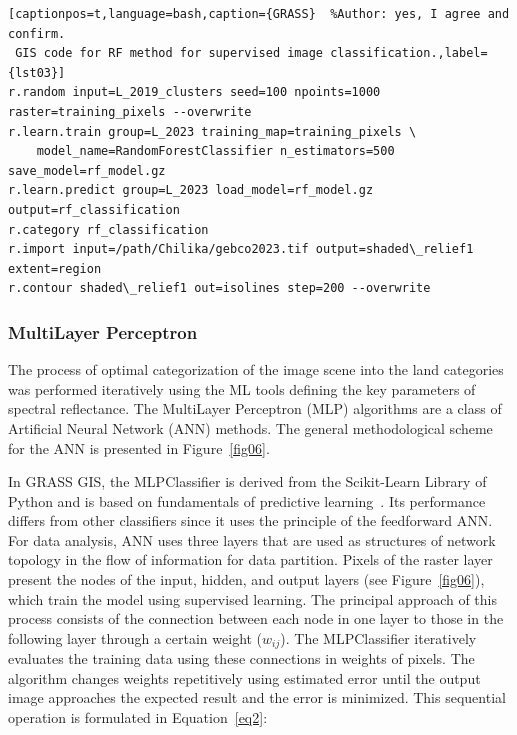 \documentclass[jmse,article,accept,pdftex,oneauthor]{Definitions/mdpi}
\begin{document}
\begin{lstlisting}[captionpos=t,language=bash,caption={GRASS}  %Author: yes, I agree and confirm.
 GIS code for RF method for supervised image classification.,label={lst03}]
r.random input=L_2019_clusters seed=100 npoints=1000 raster=training_pixels --overwrite
r.learn.train group=L_2023 training_map=training_pixels \
    model_name=RandomForestClassifier n_estimators=500 save_model=rf_model.gz
r.learn.predict group=L_2023 load_model=rf_model.gz output=rf_classification 
r.category rf_classification
r.import input=/path/Chilika/gebco2023.tif output=shaded\_relief1 extent=region 
r.contour shaded\_relief1 out=isolines step=200 --overwrite
\end{lstlisting}
\vspace{-6pt}

\subsubsection{MultiLayer Perceptron}

The process of optimal categorization of the image scene into the land categories was performed iteratively using the ML tools defining the key parameters of spectral reflectance. The MultiLayer Perceptron (MLP) algorithms are a class of Artificial Neural Network (ANN) methods. The general methodological scheme for the ANN is presented in Figure~\ref{fig06}. 



In GRASS GIS, the MLPClassifier is derived from the Scikit-Learn Library of Python 
 and is based on fundamentals of predictive learning~\cite{Rosenblatt}. Its performance differs from other classifiers since it uses the principle of the feedforward ANN. For data analysis, ANN uses three layers that are used as structures of network topology in the flow of information for data partition. Pixels of the raster layer present  the nodes of the input, hidden, and output layers (see Figure~\ref{fig06}), which train the model using supervised learning. The principal approach of this process consists of the connection between each node in one layer to those in the following layer through a certain weight ($w_{ij}$). The MLPClassifier iteratively evaluates the training data using these connections in weights of pixels. The algorithm changes weights repetitively using estimated error until the output image   approaches the expected result and the error is minimized. This sequential operation is formulated in Equation~\eqref{eq2}: 
\end{document}
